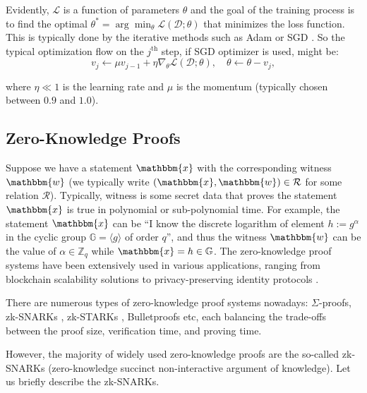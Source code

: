 \documentclass{iacrtrans}
\begin{document}
Evidently, $\mathcal{L}$ is a function of parameters $\theta$ and the goal of the training
process is to find the optimal $\theta^* =
\arg\min_{\theta}\mathcal{L}(\mathcal{D};\theta)$ that minimizes the loss function. This
is typically done by the iterative methods such as Adam \cite{adam} or SGD
\cite{sgd}. So the typical optimization flow on the $j^{\text{th}}$ step, if 
SGD optimizer is used, might be:
\begin{equation*}
    v_j \gets \mu v_{j-1} + \eta \nabla_{\theta}\mathcal{L}(\mathcal{D};\theta), \quad \theta \gets \theta - v_j,
\end{equation*}

where $\eta \ll 1$ is the learning rate and $\mu$ is the momentum (typically
chosen between $0.9$ and $1.0$).

\subsection{Zero-Knowledge Proofs}

Suppose we have a statement $\mathbbm{x}$ with the corresponding witness
$\mathbbm{w}$ (we typically write $(\mathbbm{x}, \mathbbm{w}) \in \mathcal{R}$
for some relation $\mathcal{R}$). Typically, witness is some secret data that
proves the statement $\mathbbm{x}$ is true in polynomial or sub-polynomial time.
For example, the statement $\mathbbm{x}$ can be ``I know the discrete logarithm
of element $h := g^{\alpha}$ in the cyclic group $\mathbb{G} = \langle g
\rangle$ of order $q$'', and thus the witness $\mathbbm{w}$ can be the value of
$\alpha \in \mathbb{Z}_q$ while $\mathbbm{x} = h \in \mathbb{G}$. The
zero-knowledge proof systems have been extensively used in various applications,
ranging from blockchain scalability solutions to privacy-preserving identity
protocols \cite{snark-survey}.

There are numerous types of zero-knowledge proof systems nowadays:
$\Sigma$-proofs, zk-SNARKs \cite{snark-stark-comparison}, zk-STARKs
\cite{stark}, Bulletproofs \cite{bulletproofs} etc, each balancing 
the trade-offs between the proof size, verification time, and proving time.

However, the majority of widely used zero-knowledge proofs are the so-called
zk-SNARKs (zero-knowledge succinct non-interactive argument of knowledge). Let
us briefly describe the zk-SNARKs.
\end{document}
